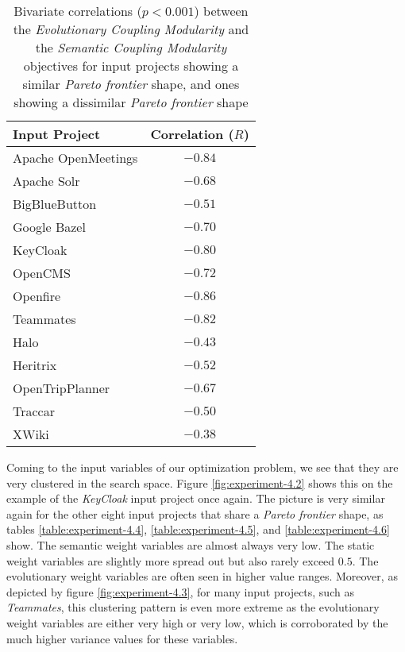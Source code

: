 \documentclass[12pt,a4paper]{report}
\begin{document}
\begin{table}[h!]
\def\arraystretch{1.55}
\begin{tabularx}{\textwidth}{|X|c|}
\hline
Input Project & Correlation ($R$) \\
\hline\hline

Apache OpenMeetings & $-0.84$  \\\hline
Apache Solr         & $-0.68$  \\\hline
BigBlueButton       & $-0.51$  \\\hline
Google Bazel        & $-0.70$  \\\hline
KeyCloak            & $-0.80$  \\\hline
OpenCMS             & $-0.72$  \\\hline
Openfire            & $-0.86$  \\\hline
Teammates           & $-0.82$  \\\hline
\hline\hline
Halo                & $-0.43$  \\\hline
Heritrix            & $-0.52$  \\\hline
OpenTripPlanner     & $-0.67$  \\\hline
Traccar             & $-0.50$  \\\hline
XWiki               & $-0.38$  \\\hline

\end{tabularx}
\caption{Bivariate correlations ($p < 0.001$) between the \textit{Evolutionary Coupling Modularity} and the \textit{Semantic Coupling Modularity} objectives for input projects showing a similar \textit{Pareto frontier} shape, and ones showing a dissimilar \textit{Pareto frontier} shape}
\label{table:experiment-4.3}
\end{table}

Coming to the input variables of our optimization problem, we see that they are
very clustered in the search space. Figure \ref{fig:experiment-4.2} shows this
on the example of the \textit{KeyCloak} input project once again.
The picture is very similar again for the other eight input projects that share
a \textit{Pareto frontier} shape, as tables \ref{table:experiment-4.4},
\ref{table:experiment-4.5}, and \ref{table:experiment-4.6} show.
The semantic weight variables are almost always very low. The static
weight variables are slightly more spread out but also rarely exceed $0.5$.
The evolutionary weight variables are often seen in higher value ranges.
Moreover, as depicted by figure \ref{fig:experiment-4.3}, for many input
projects, such as \textit{Teammates}, this clustering pattern is even more
extreme as the evolutionary weight variables are either very high or very low,
which is corroborated by the much higher variance values for these variables.
\end{document}
